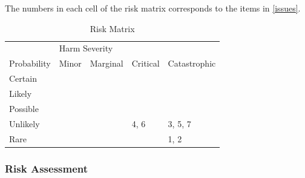 \documentclass[12pt]{article}
\begin{document}
The numbers in each cell of the risk matrix corresponds to the items in \ref{issues}.

\begin{table}[H]
\centering
\begin{tabular}{l|llll}
                              & \multicolumn{4}{l}{Harm Severity}                                                                                                                                                             \\
\multirow{-2}{*}{Probability} & \multicolumn{1}{l|}{Minor}                    & \multicolumn{1}{l|}{Marginal}                 & \multicolumn{1}{l|}{Critical}                 & \multicolumn{1}{l|}{Catastrophic}             \\ \hline
Certain                       & \multicolumn{1}{l|}{\cellcolor[HTML]{FE996B}} & \multicolumn{1}{l|}{\cellcolor[HTML]{FE996B}} & \multicolumn{1}{l|}{\cellcolor[HTML]{FD6864}} & \multicolumn{1}{l|}{\cellcolor[HTML]{FD6864}} \\ \hline
Likely                        & \multicolumn{1}{l|}{\cellcolor[HTML]{FFFE65}} & \multicolumn{1}{l|}{\cellcolor[HTML]{FE996B}} & \multicolumn{1}{l|}{\cellcolor[HTML]{FE996B}} & \multicolumn{1}{l|}{\cellcolor[HTML]{FD6864}} \\ \hline
Possible                      & \multicolumn{1}{l|}{\cellcolor[HTML]{67FD9A}} & \multicolumn{1}{l|}{\cellcolor[HTML]{FFFE65}} & \multicolumn{1}{l|}{\cellcolor[HTML]{FE996B}} & \multicolumn{1}{l|}{\cellcolor[HTML]{FD6864}} \\ \hline
Unlikely                      & \multicolumn{1}{l|}{\cellcolor[HTML]{67FD9A}} & \multicolumn{1}{l|}{\cellcolor[HTML]{FFFE65}} & \multicolumn{1}{l|}{4, 6\cellcolor[HTML]{FFFE65}} & \multicolumn{1}{l|}{3, 5, 7\cellcolor[HTML]{FE996B}} \\ \hline
Rare                          & \multicolumn{1}{l|}{\cellcolor[HTML]{67FD9A}} & \multicolumn{1}{l|}{\cellcolor[HTML]{67FD9A}} & \multicolumn{1}{l|}{\cellcolor[HTML]{FFFE65}} & \multicolumn{1}{l|}{1, 2\cellcolor[HTML]{FFFE65}} \\ \hline
\end{tabular}
\caption{Risk Matrix}
\label{tab:risk-matrix}
\end{table}


\subsubsection{Risk Assessment}
\end{document}
